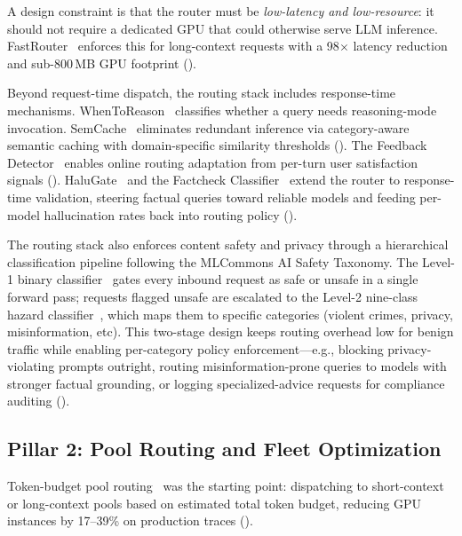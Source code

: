 A design constraint is that the router must be \emph{low-latency
and low-resource}: it should not require a dedicated GPU that could
otherwise serve LLM inference.
FastRouter~\cite{fastrouter2026} enforces this for long-context
requests with a 98$\times$ latency reduction and sub-800\,MB GPU
footprint ().

Beyond request-time dispatch, the routing stack includes
response-time mechanisms.
WhenToReason~\cite{wang2025reason} classifies whether a query needs
reasoning-mode invocation.
SemCache~\cite{wang2025cache} eliminates redundant inference via
category-aware semantic caching with domain-specific similarity
thresholds ().
The Feedback Detector~\cite{feedbackdet2026} enables online routing
adaptation from per-turn user satisfaction signals
().
HaluGate~\cite{halugate2025} and the Factcheck
Classifier~\cite{factcheck2026} extend the router to response-time
validation, steering factual queries toward reliable models and
feeding per-model hallucination rates back into routing policy
().

The routing stack also enforces content safety and privacy
through a hierarchical classification pipeline following the
MLCommons AI Safety Taxonomy.  The Level-1 binary
classifier~\cite{safetyl1_2026} gates every inbound request as
safe or unsafe in a single forward pass; requests flagged unsafe
are escalated to the Level-2 nine-class hazard
classifier~\cite{safetyl2_2026}, which maps them to specific
categories (violent crimes, privacy, misinformation, etc).
This two-stage design keeps routing overhead low for benign
traffic while enabling per-category policy enforcement---e.g.,
blocking privacy-violating prompts outright, routing
misinformation-prone queries to models with stronger factual
grounding, or logging specialized-advice requests for compliance
auditing ().


\subsection{Pillar 2: Pool Routing and Fleet Optimization}
\label{sec:foundation:fleet}

Token-budget pool routing~\cite{poolrouting2026} was the starting
point: dispatching to short-context or long-context pools based on
estimated total token budget, reducing GPU instances by 17--39\% on
production traces ().

